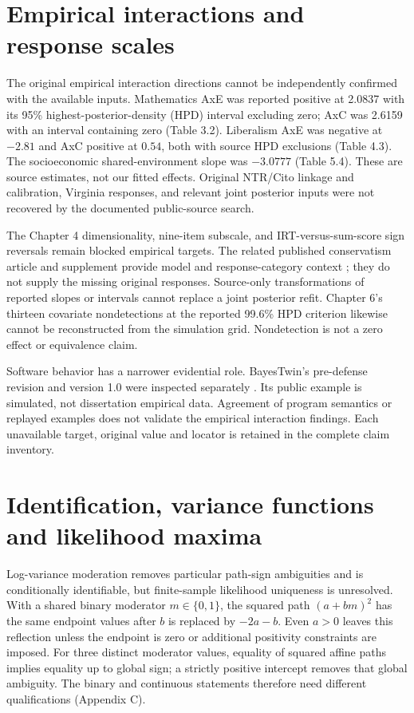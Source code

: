 \documentclass[11pt]{article}
\begin{document}
\section{Empirical interactions and response scales}
The original empirical interaction directions cannot be independently confirmed with the available inputs. Mathematics AxE was reported positive at 2.0837 with its 95\% highest-posterior-density (HPD) interval excluding zero; AxC was 2.6159 with an interval containing zero (Table 3.2). Liberalism AxE was negative at $-2.81$ and AxC positive at $0.54$, both with source HPD exclusions (Table 4.3). The socioeconomic shared-environment slope was $-3.0777$ (Table 5.4). These are source estimates, not our fitted effects. Original NTR/Cito linkage and calibration, Virginia responses, and relevant joint posterior inputs were not recovered by the documented public-source search.

The Chapter 4 dimensionality, nine-item subscale, and IRT-versus-sum-score sign reversals remain blocked empirical targets. The related published conservatism article and supplement provide model and response-category context \citep{schwabeConservatism}; they do not supply the missing original responses. Source-only transformations of reported slopes or intervals cannot replace a joint posterior refit. Chapter 6's thirteen covariate nondetections at the reported 99.6\% HPD criterion likewise cannot be reconstructed from the simulation grid. Nondetection is not a zero effect or equivalence claim.

Software behavior has a narrower evidential role. BayesTwin's pre-defense revision and version 1.0 were inspected separately \citep{bayestwin}. Its public example is simulated, not dissertation empirical data. Agreement of program semantics or replayed examples does not validate the empirical interaction findings. Each unavailable target, original value and locator is retained in the complete claim inventory.

\section{Identification, variance functions and likelihood maxima}
Log-variance moderation removes particular path-sign ambiguities and is conditionally identifiable, but finite-sample likelihood uniqueness is unresolved. With a shared binary moderator $m\in\{0,1\}$, the squared path $(a+bm)^2$ has the same endpoint values after $b$ is replaced by $-2a-b$. Even $a>0$ leaves this reflection unless the endpoint is zero or additional positivity constraints are imposed. For three distinct moderator values, equality of squared affine paths implies equality up to global sign; a strictly positive intercept removes that global ambiguity. The binary and continuous statements therefore need different qualifications (Appendix C).
\end{document}
